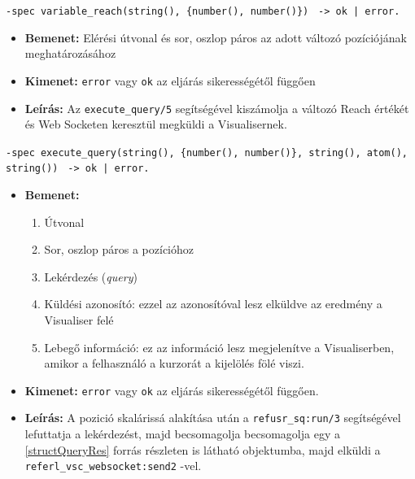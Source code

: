     
    \noindent \lstinline|-spec variable_reach(string(), {number(), number()})| \lstinline{ -> ok | error.}
    \begin{itemize}
        \item \textbf{Bemenet:} Elérési útvonal és sor, oszlop páros az adott változó pozíciójának meghatározásához
        \item \textbf{Kimenet:} \lstinline{error} vagy \lstinline{ok} az eljárás sikerességétől függően
        \item \textbf{Leírás:} Az \lstinline{execute_query/5} segítségével kiszámolja a változó Reach értékét és Web Socketen keresztül megküldi a Visualisernek.
    \end{itemize}
    \item \lstinline|-spec execute_query(string(), {number(), number()}, string(), atom(), string())| \lstinline{ -> ok | error.}
    \begin{itemize}
        \item \textbf{Bemenet:}
        \begin{enumerate}
            \item Útvonal
            \item Sor, oszlop páros a pozícióhoz
            \item Lekérdezés (\textit{query})
            \item Küldési azonosító: ezzel az azonosítóval lesz elküldve az eredmény a Visualiser felé
            \item Lebegő információ: ez az információ lesz megjelenítve a Visualiserben, amikor a felhasználó a kurzorát a kijelölés fölé viszi.
        \end{enumerate}
        \item \textbf{Kimenet:} \lstinline{error} vagy \lstinline{ok} az eljárás sikerességétől függően.
        \item \textbf{Leírás:} A pozició skalárissá alakítása után a \lstinline{refusr_sq:run/3} segítségével lefuttatja a lekérdezést, majd becsomagolja becsomagolja egy a \ref{structQueryRes} forrás részleten is látható objektumba, majd elküldi a \lstinline{referl_vsc_websocket:send2}  -vel.
    \end{itemize}
    


